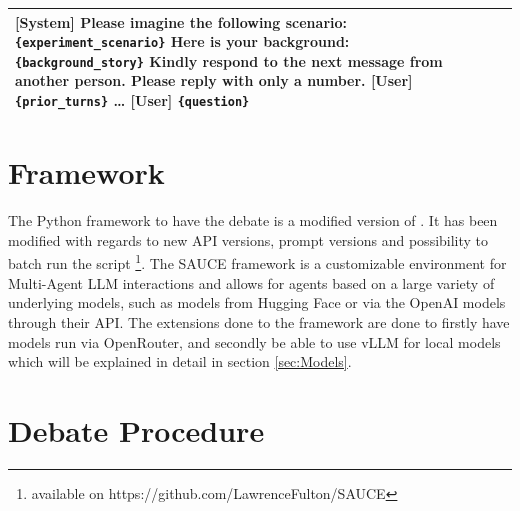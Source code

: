 \begin{table}[htbp]
\begin{tabularx}{\textwidth}{@{} l L L @{}}
        
        \textbf{[System]} \textbf{Please imagine the following scenario:} \texttt{\{experiment\_scenario\}} \newline 
        \textbf{Here is your background:} \texttt{\{background\_story\}} \newline
        Kindly respond to the next message from another person. Please reply with only a number. \newline 
        \textbf{[User]} \texttt{\{prior\_turns\}} \newline
        \dots \newline
        \textbf{[User]} \texttt{\{question\}} \\
        \bottomrule
    \end{tabularx}
\end{table}

\section{Framework}


The Python framework to have the debate is a modified version of \cite{neuberger2024sauce}. It has been modified with regards to new API versions, prompt versions and possibility to batch run the script \footnote{available on https://github.com/LawrenceFulton/SAUCE}. The SAUCE framework is a customizable environment for Multi-Agent LLM interactions and allows for agents based on a large variety of underlying models, such as models from Hugging Face or via the OpenAI models through their API. The extensions done to the framework are done to firstly have models run via OpenRouter, and secondly be able to use vLLM for local models which will be explained in detail in section \ref{sec:Models}.

 

\section{Debate Procedure}
\label{sec:debate_procedure}


